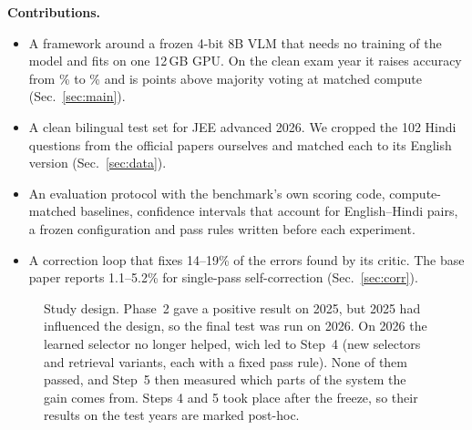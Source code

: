 \documentclass[conference]{IEEEtran}
\begin{document}
\textbf{Contributions.}
\begin{itemize}
\item A framework around a frozen 4-bit 8B VLM that needs no training of the model and fits on one
12\,GB GPU. On the clean exam year it raises accuracy from \ThreeBase\% to \ThreeAcc\% and is
\ThreeVsSc{} points above majority voting at matched compute (Sec.~\ref{sec:main}).
\item A clean bilingual test set for JEE advanced 2026. We cropped the 102 Hindi questions from the
official papers ourselves and matched each to its English version (Sec.~\ref{sec:data}).
\item An evaluation protocol with the benchmark's own scoring code, compute-matched baselines,
confidence intervals that account for English--Hindi pairs, a frozen configuration and pass
rules written before each experiment.
\item A correction loop that fixes 14--19\% of the errors found by its critic. The base paper
reports 1.1--5.2\% for single-pass self-correction (Sec.~\ref{sec:corr}).
\end{itemize}

\begin{figure}[t]
\centering
{}
\caption{Study design. Phase~2 gave a positive result on 2025, but 2025 had influenced the
design, so the final test was run on 2026. On 2026 the learned selector no longer helped, wich
led to Step~4 (new selectors and retrieval variants, each with a fixed pass rule). None of them
passed, and Step~5 then measured which parts of the system the gain comes from. Steps 4 and 5
took place after the freeze, so their results on the test years are marked post-hoc.}
\label{fig:design}
\end{figure}
\end{document}
